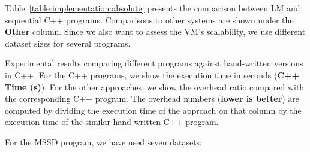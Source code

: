 Table~\ref{table:implementation:absolute} presents the comparison between LM and
sequential C++ programs. Comparisons to other systems are shown under the
\textbf{Other} column. Since we also want to assess the VM's scalability, we use
different dataset sizes for several programs.

\begin{table}[ht]
   \begin{center}
      
   \end{center}

   \caption{Experimental results comparing different programs against
      hand-written versions in C++. For the C++ programs, we show the execution
      time in seconds (\textbf{C++ Time (s)}). For the other approaches, we show
      the overhead ratio compared with the corresponding C++ program. The
      overhead numbers (\textbf{lower is better}) are computed by dividing the
   execution time of the approach on that column by the execution time of the
similar hand-written C++ program.}

   \label{table:implementation:absolute}
\end{table}

For the MSSD program, we have used seven datasets:

